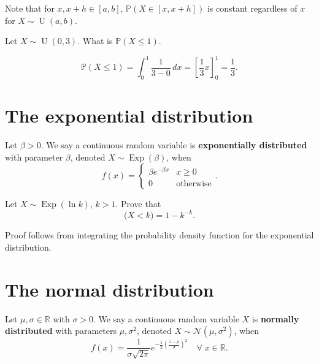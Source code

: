 \begin{remark}
    Note that for $x, x + h \in [a, b]$, $\mathbb P(X \in [x, x + h])$ is constant regardless of $x$ for $X \sim \operatorname{U}(a, b)$.
\end{remark}

\begin{example}
    Let $X \sim \operatorname{U}(0, 3)$. What is $\mathbb P(X \leq 1)$.
\end{example}

\begin{solution}
   \[ \mathbb P(X \leq 1) = \int_0^1 \frac{1}{3 - 0} \, dx = \left[\frac13x\right]^1_0 = \frac13. \] 
\end{solution}

\section{The exponential distribution}

\begin{definition}
Let $\beta > 0$. We say a continuous random variable is \textbf{exponentially distributed} with parameter $\beta$, denoted $X \sim \operatorname{Exp}(\beta)$, when \[ f(x) = \begin{cases} \beta e^{-\beta x} & x \geq 0 \\ 0 & \text{otherwise} \end{cases}. \]
\end{definition}

\begin{example}
    Let $X \sim \operatorname{Exp}(\ln{k})$, $k > 1$. Prove that \[ \mathbb (X < k) = 1 - k^{-k}. \]
\end{example}

\begin{solution}
    Proof follows from integrating the probability density function for the exponential distribution. 
\end{solution}

\section{The normal distribution}

\begin{definition}
    Let $\mu, \sigma \in \mathbb R$ with $\sigma > 0$. We say a continuous random variable $X$ is \textbf{normally distributed} with parameters $\mu, \sigma^2$, denoted $X \sim \mathcal N(\mu, \sigma^2)$, when \[ f(x) = \frac{1}{\sigma \sqrt{2 \pi}} e^{-\frac12\left(\frac{x - \mu}{\sigma}\right)^2} \quad \forall \; x \in \mathbb R. \]
\end{definition}

